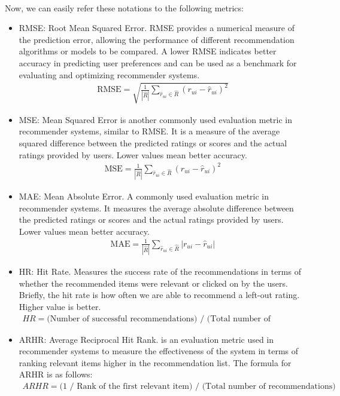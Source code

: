 \documentclass{cup-pan}
\begin{document}
\paragraph{}
\noindent
Now, we can easily refer these notations to the following metrics:
\\
\begin{itemize}
  \item RMSE: Root Mean Squared Error. RMSE provides a numerical measure of the prediction error, allowing the performance of different recommendation algorithms or models to be compared. A lower RMSE indicates better accuracy in predicting user preferences and can be used as a benchmark for evaluating and optimizing recommender systems.
  \begin{align}
  \mathrm{RMSE}=\sqrt{\frac{1}{|\hat{R}|} \sum_{\hat{r}_{u i} \in \hat{R}}\left(r_{u i}-\hat{r}_{u i}\right)^2}
  \end{align}
  
  \item MSE: Mean Squared Error is another commonly used evaluation metric in recommender systems, similar to RMSE. It is a measure of the average squared difference between the predicted ratings or scores and the actual ratings provided by users. Lower values mean better accuracy.
  \begin{align}
  \mathrm{MSE}=\frac{1}{|\hat{R}|} \sum_{\hat{r}_{u i} \in \hat{R}}\left(r_{u i}-\hat{r}_{u i}\right)^2
  \end{align}
  \item MAE: Mean Absolute Error. A commonly used evaluation metric in recommender systems. It measures the average absolute difference between the predicted ratings or scores and the actual ratings provided by users. Lower values mean better accuracy.
  \begin{align}
  \mathrm{MAE}=\frac{1}{|\hat{R}|} \sum_{\hat{r}_{u i} \in \hat{R}}\left|r_{u i}-\hat{r}_{u i}\right|
  \end{align}
  \item HR: Hit Rate. Measures the success rate of the recommendations in terms of whether the recommended items were relevant or clicked on by the users. Briefly, the hit rate is how often we are able to recommend a left-out rating. Higher value is better.
  \begin{align}
  HR = \text{(Number of successful recommendations) / (Total number of recommendations)}
  \end{align}

  \item ARHR: Average Reciprocal Hit Rank. is an evaluation metric used in recommender systems to measure the effectiveness of the system in terms of ranking relevant items higher in the recommendation list. The formula for ARHR is as follows:
  \begin{align}
    ARHR = \text{(1 / Rank of the first relevant item) / (Total number of recommendations)}
  \end{align}
\end{itemize}
\end{document}

